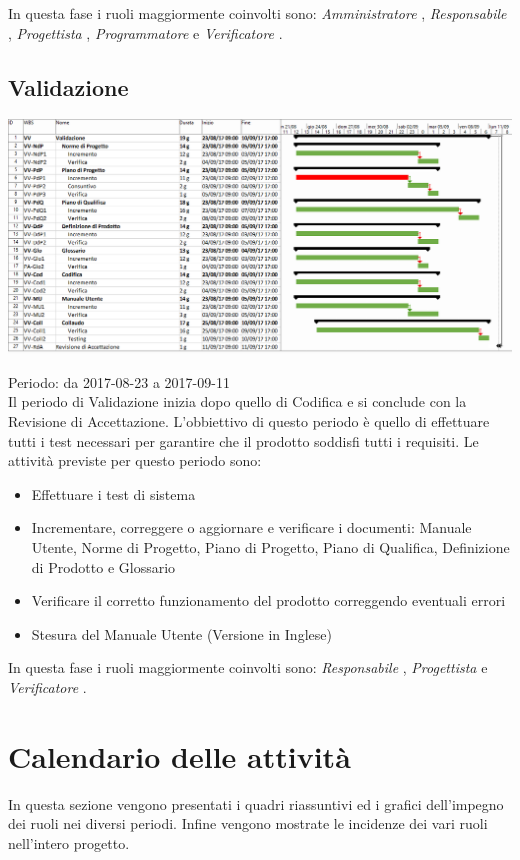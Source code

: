 In questa fase i ruoli maggiormente coinvolti sono:  \emph{Amministratore} ,  \emph{Responsabile} ,
 \emph{Progettista} ,  \emph{Programmatore}  e  \emph{Verificatore} .

\subsection{Validazione}

\begin{center}
  \includegraphics[scale=0.18]{img/6-VA.png}
\end{center}

Periodo: da 2017-08-23 a 2017-09-11 \\
Il periodo di Validazione inizia dopo quello di Codifica e si conclude con la Revisione
di Accettazione.
L'obbiettivo di questo periodo è quello di effettuare tutti i test necessari per garantire
che il prodotto soddisfi tutti i requisiti. 
Le attività previste per questo periodo sono:
\begin{itemize}
\item Effettuare i test di sistema
\item Incrementare, correggere o aggiornare e verificare i documenti: Manuale Utente, Norme di Progetto, Piano di Progetto, Piano di Qualifica, Definizione di Prodotto e Glossario
\item Verificare il corretto funzionamento del prodotto correggendo eventuali errori
\item Stesura del Manuale Utente (Versione in Inglese)
\end{itemize}

In questa fase i ruoli maggiormente coinvolti sono:  \emph{Responsabile} ,  \emph{Progettista} 
e  \emph{Verificatore} .

\section{Calendario delle attività}
In questa sezione vengono presentati i quadri riassuntivi ed i grafici dell'impegno dei ruoli nei diversi periodi. Infine vengono mostrate le incidenze dei vari ruoli nell'intero progetto.


